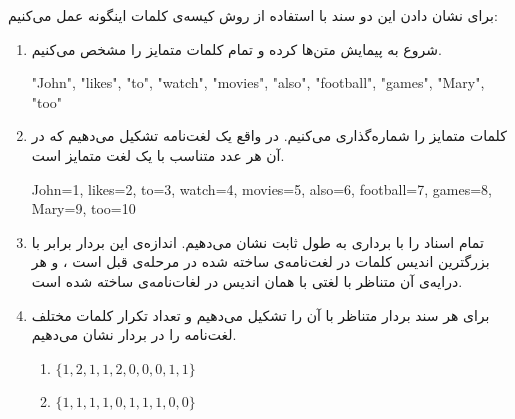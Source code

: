 برای نشان دادن این دو سند با استفاده از روش کیسه‌ی‌ کلمات اینگونه عمل می‌‌کنیم:
\vspace{-0.4cm}
\begin{enumerate}
	
	\item  شروع به پیمایش متن‌ها کرده و تمام کلمات متمایز را مشخص می‌کنیم.
	\vspace{0.1cm}
	\begin{latin}
		"John", "likes", "to", "watch", "movies", "also", "football", "games", "Mary", "too"
	\end{latin}
	\vspace{-0.4cm}
	
	\item کلمات متمایز را شماره‌گذاری می‌‌کنیم. در واقع یک لغت‌نامه تشکیل می‌‌دهیم که در آن هر عدد متناسب با یک لغت متمایز است.
	\vspace{0.1cm}
	\begin{latin}
		John=1, likes=2, to=3, watch=4, movies=5, also=6, football=7, games=8, Mary=9, too=10
	\end{latin}
	\vspace{-0.4cm}
	
	\item تمام اسناد را با برداری به طول ثابت نشان می‌‌دهیم. اندازه‌ی  این بردار برابر با بزرگترین اندیس کلمات در لغت‌نامه‌ی ساخته شده در مرحله‌ی قبل است ، و هر درایه‌ی آن متناظر با لغتی با همان اندیس در لغات‌نامه‌ی ساخته شده است.
	
	\item برای هر سند بردار متناظر با آن را تشکیل می‌‌دهیم و تعداد تکرار کلمات مختلف لغت‌نامه را در بردار نشان می‌‌دهیم.
	\vspace{0.1cm}
	\begin{latin}
		\begin{enumerate}
			\item $\{1, 2, 1, 1, 2, 0, 0, 0, 1, 1\}$
			\item $\{1, 1, 1, 1, 0, 1, 1, 1, 0, 0\}$
		\end{enumerate}
	\end{latin}
	\vspace{-0.4cm}
		
\end{enumerate}

